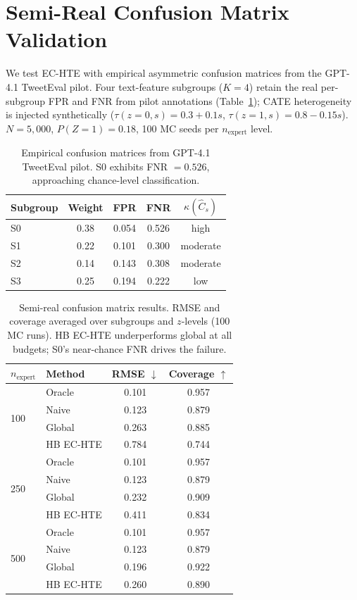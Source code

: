 \section{Semi-Real Confusion Matrix Validation}
\label{app:semireal}

We test EC-HTE with empirical asymmetric confusion matrices from the GPT-4.1 TweetEval pilot.
Four text-feature subgroups ($K{=}4$) retain the real per-subgroup FPR and FNR from pilot annotations (Table~\ref{tab:semireal_cm}); CATE heterogeneity is injected synthetically ($\tau(z{=}0,s) = 0.3 + 0.1s$, $\tau(z{=}1,s) = 0.8 - 0.15s$).
$N{=}5{,}000$, $P(Z{=}1){=}0.18$, 100 MC seeds per $n_{\text{expert}}$ level.

\begin{table}[t]
\centering
\caption{Empirical confusion matrices from GPT-4.1 TweetEval pilot.
S0 exhibits FNR $= 0.526$, approaching chance-level classification.}
\label{tab:semireal_cm}
\small
\begin{tabular}{lcccc}
\toprule
Subgroup & Weight & FPR & FNR & $\kappa(\hat{C}_s)$ \\
\midrule
S0 & 0.38 & 0.054 & 0.526 & high \\
S1 & 0.22 & 0.101 & 0.300 & moderate \\
S2 & 0.14 & 0.143 & 0.308 & moderate \\
S3 & 0.25 & 0.194 & 0.222 & low \\
\bottomrule
\end{tabular}
\end{table}

\begin{table}[t]
\centering
\caption{Semi-real confusion matrix results. RMSE and coverage averaged over subgroups and $z$-levels (100 MC runs). HB EC-HTE underperforms global at all budgets; S0's near-chance FNR drives the failure.}
\label{tab:semireal}
\small
\begin{tabular}{llcc}
\toprule
$n_{\text{expert}}$ & Method & RMSE $\downarrow$ & Coverage $\uparrow$ \\
\midrule
\multirow{4}{*}{100}
 & Oracle & 0.101 & 0.957 \\
 & Naive & 0.123 & 0.879 \\
 & Global & 0.263 & 0.885 \\
 & HB EC-HTE & 0.784 & 0.744 \\
\midrule
\multirow{4}{*}{250}
 & Oracle & 0.101 & 0.957 \\
 & Naive & 0.123 & 0.879 \\
 & Global & 0.232 & 0.909 \\
 & HB EC-HTE & 0.411 & 0.834 \\
\midrule
\multirow{4}{*}{500}
 & Oracle & 0.101 & 0.957 \\
 & Naive & 0.123 & 0.879 \\
 & Global & 0.196 & 0.922 \\
 & HB EC-HTE & 0.260 & 0.890 \\
\bottomrule
\end{tabular}
\end{table}

